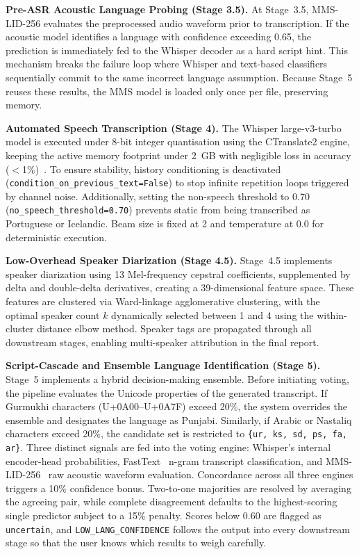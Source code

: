 \documentclass[conference]{IEEEtran}
\begin{document}
\textbf{Pre-ASR Acoustic Language Probing (Stage 3.5).}
At Stage~3.5, MMS-LID-256 evaluates the preprocessed audio waveform prior to transcription. If the acoustic model identifies a language with confidence exceeding 0.65, the prediction is immediately fed to the Whisper decoder as a hard script hint. This mechanism breaks the failure loop where Whisper and text-based classifiers sequentially commit to the same incorrect language assumption. Because Stage~5 reuses these results, the MMS model is loaded only once per file, preserving memory.

\textbf{Automated Speech Transcription (Stage 4).}
The Whisper large-v3-turbo~\cite{radford2022whisper} model is executed under 8-bit integer quantisation using the CTranslate2 engine, keeping the active memory footprint under 2~GB with negligible loss in accuracy ($<$1\%)~\cite{lin2024awq}. To ensure stability, history conditioning is deactivated (\texttt{condition\_on\_previous\_text=False}) to stop infinite repetition loops triggered by channel noise. Additionally, setting the non-speech threshold to 0.70 (\texttt{no\_speech\_threshold=0.70}) prevents static from being transcribed as Portuguese or Icelandic. Beam size is fixed at 2 and temperature at 0.0 for deterministic execution.

\textbf{Low-Overhead Speaker Diarization (Stage 4.5).}
Stage~4.5 implements speaker diarization using 13 Mel-frequency cepstral coefficients, supplemented by delta and double-delta derivatives, creating a 39-dimensional feature space. These features are clustered via Ward-linkage agglomerative clustering, with the optimal speaker count $k$ dynamically selected between 1 and 4 using the within-cluster distance elbow method. Speaker tags are propagated through all downstream stages, enabling multi-speaker attribution in the final report.

\textbf{Script-Cascade and Ensemble Language Identification (Stage 5).}
Stage~5 implements a hybrid decision-making ensemble. Before initiating voting, the pipeline evaluates the Unicode properties of the generated transcript. If Gurmukhi characters (U+0A00--U+0A7F) exceed 20\%, the system overrides the ensemble and designates the language as Punjabi. Similarly, if Arabic or Nastaliq characters exceed 20\%, the candidate set is restricted to \texttt{\{ur, ks, sd, ps, fa, ar\}}. Three distinct signals are fed into the voting engine: Whisper's internal encoder-head probabilities, FastText~\cite{joulin2017bag} n-gram transcript classification, and MMS-LID-256~\cite{pratap2023scaling} raw acoustic waveform evaluation. Concordance across all three engines triggers a 10\% confidence bonus. Two-to-one majorities are resolved by averaging the agreeing pair, while complete disagreement defaults to the highest-scoring single predictor subject to a 15\% penalty. Scores below 0.60 are flagged as \texttt{uncertain}, and \texttt{LOW\_LANG\_CONFIDENCE} follows the output into every downstream stage so that the user knows which results to weigh carefully.
\end{document}
